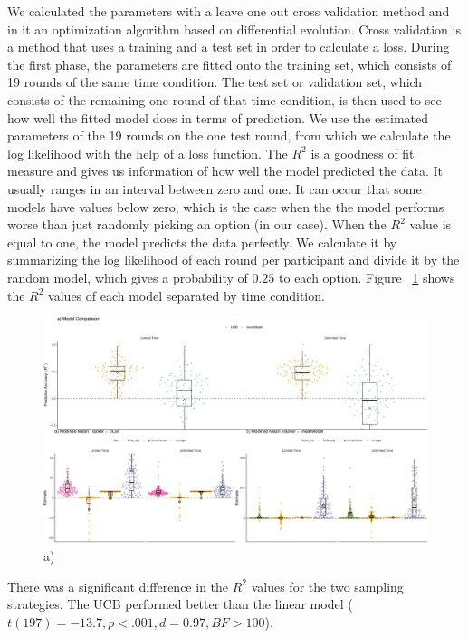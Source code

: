 We calculated the parameters with a leave one out cross validation method and in it an optimization algorithm based on differential evolution\citep{DEoptim}. 
Cross validation is a method that uses a training and a test set in order to calculate a loss.
During the first phase, the parameters are fitted onto the training set, which consists of 19 rounds of the same time condition. 
The test set or validation set, which consists of the remaining one round of that time condition, is then used to see how well the fitted model does in terms of prediction. We use the estimated parameters of the 19 rounds on the one test round, from which we calculate the log likelihood with the help of a loss function. 
The $R^2$ is a goodness of fit measure and gives us information of how well the model predicted the data. It usually ranges in an interval between zero and one. It can occur that some models have values below zero, which is the case when the the model performs worse than just randomly picking an option (in our case). When the $R^2$ value is equal to one, the model predicts the data perfectly. We calculate it by summarizing the log likelihood of each round per participant and divide it by the random model, which gives a probability of $0.25$ to each option.
Figure ~\ref{fig:R2ConditionsPayoff} shows the $R^2$ values of each model separated by time condition. 
\begin{figure}
    \centering
    \includegraphics[width=1\textwidth]{Plots/ModellingResults.pdf}
    \caption[Modeling Results for the Modified Mean Tracker]{a) }
    \label{fig:R2ConditionsPayoff}
\end{figure}
There was a significant difference in the $R^2$ values for the two sampling strategies. The UCB performed better than the linear model ($t(197)=-13.7, p<.001,d=0.97, BF>100$).  
